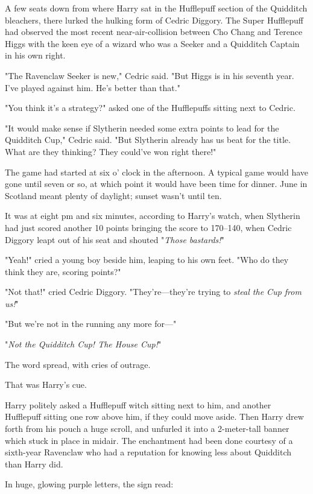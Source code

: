 A few seats down from where Harry sat in the Hufflepuff section of the 
Quidditch bleachers, there lurked the hulking form of Cedric Diggory. The Super 
Hufflepuff had observed the most recent near-air-collision between Cho Chang 
and Terence Higgs with the keen eye of a wizard who was a Seeker and a 
Quidditch Captain in his own right.

"The Ravenclaw Seeker is new," Cedric said. "But Higgs is in his seventh year. 
I've played against him. He's better than that."

"You think it's a strategy?" asked one of the Hufflepuffs sitting next to 
Cedric.

"It would make sense if Slytherin needed some extra points to lead for the 
Quidditch Cup," Cedric said. "But Slytherin already has us beat for the title. 
What are they thinking? They could've won right there!"

The game had started at six o' clock in the afternoon. A typical game would 
have gone until seven or so, at which point it would have been time for dinner. 
June in Scotland meant plenty of daylight; sunset wasn't until ten.

It was at eight pm and six minutes, according to Harry's watch, when Slytherin 
had just scored another 10 points bringing the score to 170--{140}, when Cedric 
Diggory leapt out of his seat and shouted "\emph{Those bastards!}"

"Yeah!" cried a young boy beside him, leaping to his own feet. "Who do they 
think they are, scoring points?"

"Not that!" cried Cedric Diggory. "They're---they're trying to \emph{steal the 
Cup from us!}"

"But we're not in the running any more for---"

"\emph{Not the Quidditch Cup! The House Cup!}"

The word spread, with cries of outrage.

That was Harry's cue.

Harry politely asked a Hufflepuff witch sitting next to him, and another 
Hufflepuff sitting one row above him, if they could move aside. Then Harry drew 
forth from his pouch a huge scroll, and unfurled it into a 2-meter-tall banner 
which stuck in place in midair. The enchantment had been done courtesy of a 
sixth-year Ravenclaw who had a reputation for knowing less about Quidditch than 
Harry did.

In huge, glowing purple letters, the sign read:

